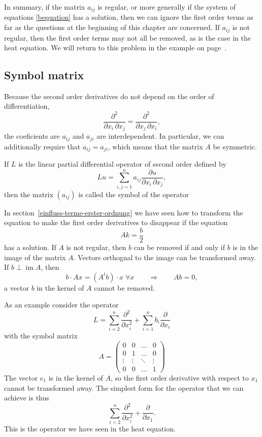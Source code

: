 In summary, if the matrix $a_{ij}$ is regular, or more generally if the
system of equations \eqref{bequation} has a solution, then we can
ignore the first order terms as far as the questions at the beginning
of this chapter are concerned.
If $a_{ij}$ is not regular, then the first order terms may not all
be removed, as is the case in the heat equation.
We will return to this problem in the example on page~\pageref{heatexample}.

\subsection{Symbol matrix}
Because the second order derivatives do not depend on the order
of differentiation,
\[
\frac{\partial^2}{\partial x_i\,\partial x_j}
=
\frac{\partial^2}{\partial x_j\,\partial x_i},
\]
the coeficients are 
$a_{ij}$ and $a_{ji}$ are interdependent.
In particular, we can additionally require that $a_{ij}=a_{ji}$,
which means that the matrix $A$ be symmetric.

\begin{definition}
If $L$ is the linear partial differential operator of second order
defined by
\[
Lu=\sum_{i,j=1}^na_{ij}\frac{\partial u}{\partial x_i\,\partial x_j},
\]
then the matrix $(a_{ij})$ is called the symbol of the operator
\end{definition}

In section~\ref{einfluss-terme-erster-ordnung} we have seen how to
transform the equation to make the first order derivatives to
disappear if the equation
\[
Ak=\frac{b}2
\]
has a solution.
If $A$ is not regular, then $b$ can be removed if and only if $b$ is in 
the image of the matrix $A$.
Vectors orthognal to the image can be transformed away.
If $b\perp \operatorname{im} A$, then 
\[
b\cdot Ax=(A^tb)\cdot x\;\forall x
\qquad\Rightarrow\qquad
Ab=0,
\]
a vector $b$ in the kernel of $A$ cannot be removed.

\begin{beispiel}
\label{heatexample}
As an example consider the operator
\[
L
=
\sum_{i=2}^n\frac{\partial^2}{\partial x_i^2}
+
\sum_{i=1}^nb_i\frac{\partial}{\partial x_i}
\]
with the symbol matrix
\[
A=\begin{pmatrix}
      0&      0& \dots&0\\
      0&      1& \dots&0\\
\vdots &\vdots &\ddots&\vdots\\
      0&      0&\dots &1
\end{pmatrix}
\]
The vector $e_1$ is in the kernel of $A$, so the first order derivative
with respect to $x_1$ cannot be transformed away.
The simplest form for the operator that we can achieve is thus
\[
\sum_{i=2}^n\frac{\partial^2}{\partial x_i^2}
+
\frac{\partial}{\partial x_1}.
\]
This is the operator we have seen in the heat equation.
\end{beispiel}

